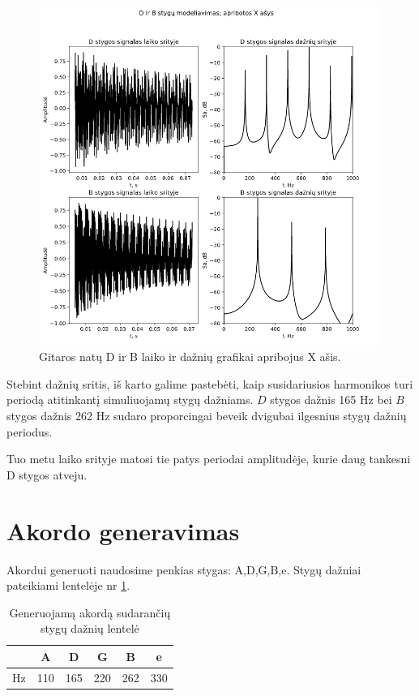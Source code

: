 \documentclass[10pt,a4paper,twocolumn]{article}
\begin{document}
\begin{figure} %
	[!h]
	\centering
	\includegraphics*[width=.9\columnwidth]{d_b2.png} %
	\caption{Gitaros natų D ir B laiko ir dažnių grafikai apribojus X ašis.}
	\label{D_B2}
	\vspace{6pt}
\end{figure}

Stebint dažnių sritis, iš karto galime pastebėti, kaip susidariusios harmonikos turi periodą atitinkantį simuliuojamų stygų dažniams. $D$ stygos dažnis 165 Hz bei $B$ stygos dažnis 262 Hz sudaro proporcingai beveik dvigubai ilgesnius stygų dažnių periodus.

Tuo metu laiko srityje matosi tie patys periodai amplitudėje, kurie daug tankesni D stygos atveju.


\section*{Akordo generavimas}

Akordui generuoti naudosime penkias stygas: A,D,G,B,e. Stygų dažniai pateikiami lentelėje nr \ref{dazniu_lentele}.

\begin{table}[!h] %
\caption{Generuojamą akordą sudarančių stygų dažnių lentelė}
\label{dazniu_lentele}
\begin{tabular}{lccccc}
\hline
\multicolumn{1}{c}{} & A & D & G & B & e \\ \hline
Hz & 110 & 165 & 220 & 262 & 330 \\ \hline
\end{tabular}
\end{table}
\end{document}

